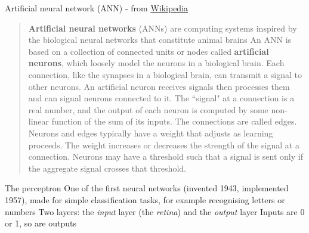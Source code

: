 \documentclass[aspectratio=169]{beamer}\usepackage[]{graphicx}\usepackage[]{xcolor}
\begin{document}
\begin{frame}{Artificial neural network (ANN) - from \href{https://en.wikipedia.org/wiki/Artificial_neural_network}{Wikipedia}}
    \begin{quote}
    \textbf{Artificial neural networks} (ANNs) are computing systems inspired by the biological neural networks that constitute animal brains
    \vfill
    An ANN is based on a collection of connected units or nodes called \textbf{artificial neurons}, which loosely model the neurons in a biological brain. Each connection, like the synapses in a biological brain, can transmit a signal to other neurons. An artificial neuron receives signals then processes them and can signal neurons connected to it. The ``signal" at a connection is a real number, and the output of each neuron is computed by some non-linear function of the sum of its inputs. The connections are called edges. Neurons and edges typically have a weight that adjusts as learning proceeds. The weight increases or decreases the strength of the signal at a connection. Neurons may have a threshold such that a signal is sent only if the aggregate signal crosses that threshold.
    \end{quote}
\end{frame}


\begin{frame}{The perceptron}
    One of the first neural networks (invented 1943, implemented 1957), made for simple classification tasks, for example recognising letters or numbers
    \vfill
    Two layers: the \emph{input} layer (the \emph{retina}) and the \emph{output} layer
    \vfill
    Inputs are 0 or 1, so are outputs
\end{frame}
\end{document}
